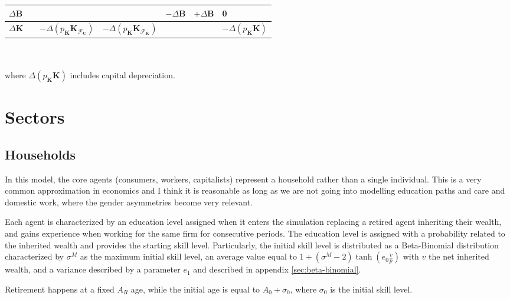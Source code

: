 \documentclass[a4paper, headings=standardclasses]{scrartcl}
\numberwithin{equation}{subsection}
\begin{document}
{\begin{tabularx}{\textwidth}{@{} Y|ccccc|l @{}}
        $\Delta\mathbf{B}$     &                                          &                                                                 &                                                                                        & $-\Delta\mathbf{B}$          & $+\Delta\mathbf{B}$                      & 0                                 \\
        \midrule
        $\Delta\mathbf{K}$     &                                          & $-\Delta(p_\mathbf{K}\mathbf{K}_{\mathcal{F}_\mathbf{C}})$      & $-\Delta(p_\mathbf{K}\mathbf{K}_{\mathcal{F}_\mathbf{K}})$                             &                              &                                          & $-\Delta(p_\mathbf{K}\mathbf{K})$ \\
        \bottomrule
    \end{tabularx}
}\\ \\
where $\Delta(p_\mathbf{K}\mathbf{K})$ includes capital depreciation.

\section{Sectors}
\subsection{Households}
In this model, the core agents (consumers, workers, capitalists) represent a household rather than a single individual. This is a very common approximation in economics and I think it is reasonable as long as we are not going into modelling education paths and care and domestic work, where the gender asymmetries become very relevant.

Each agent is characterized by an education level assigned when it enters the simulation replacing a retired agent inheriting their wealth, and gains experience when working for the same firm for consecutive periods.
The education level is assigned with a probability related to the inherited wealth and provides the starting skill level.
Particularly, the initial skill level is distributed as a Beta-Binomial distribution characterized by $\sigma^M$ as the maximum initial skill level, an average value equal to $1+(\sigma^M-2)\tanh(e_0 \frac{v}{p})$ with $v$ the net inherited wealth, and a variance described by a parameter $e_1$ and described in appendix \ref{sec:beta-binomial}.

Retirement happens at a fixed $A_R$ age, while the initial age is equal to $A_0 + \sigma_0$, where $\sigma_0$ is the initial skill level.
\end{document}
